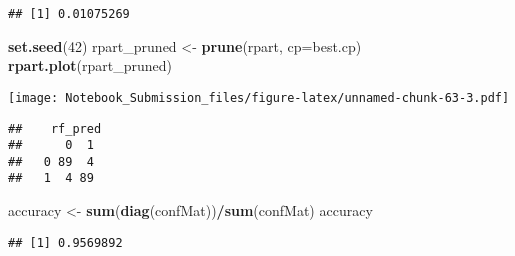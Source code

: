 \documentclass[
]{article}
\newenvironment{Shaded}{\begin{snugshade}}{\end{snugshade}}
\newcommand{\CommentTok}[1]{\textcolor[rgb]{0.56,0.35,0.01}{\textit{#1}}}
\newcommand{\DataTypeTok}[1]{\textcolor[rgb]{0.13,0.29,0.53}{#1}}
\newcommand{\DecValTok}[1]{\textcolor[rgb]{0.00,0.00,0.81}{#1}}
\newcommand{\KeywordTok}[1]{\textcolor[rgb]{0.13,0.29,0.53}{\textbf{#1}}}
\newcommand{\NormalTok}[1]{#1}
\newcommand{\OperatorTok}[1]{\textcolor[rgb]{0.81,0.36,0.00}{\textbf{#1}}}
\newcommand{\StringTok}[1]{\textcolor[rgb]{0.31,0.60,0.02}{#1}}
\begin{document}
\begin{verbatim}
## [1] 0.01075269
\end{verbatim}

\begin{Shaded}
\begin{Highlighting}[]
\KeywordTok{set.seed}\NormalTok{(}\DecValTok{42}\NormalTok{)}
\NormalTok{rpart_pruned <-}\StringTok{ }\KeywordTok{prune}\NormalTok{(rpart, }\DataTypeTok{cp=}\NormalTok{best.cp)}
\KeywordTok{rpart.plot}\NormalTok{(rpart_pruned)}
\end{Highlighting}
\end{Shaded}

\texttt{[image: Notebook\_Submission\_files/figure-latex/unnamed-chunk-63-3.pdf]}

\begin{Shaded}
\end{Shaded}

\begin{verbatim}
##    rf_pred
##      0  1
##   0 89  4
##   1  4 89
\end{verbatim}

\begin{Shaded}
\begin{Highlighting}[]
\NormalTok{accuracy <-}\StringTok{ }\KeywordTok{sum}\NormalTok{(}\KeywordTok{diag}\NormalTok{(confMat))}\OperatorTok{/}\KeywordTok{sum}\NormalTok{(confMat)}
\NormalTok{accuracy}
\end{Highlighting}
\end{Shaded}

\begin{verbatim}
## [1] 0.9569892
\end{verbatim}
\end{document}
